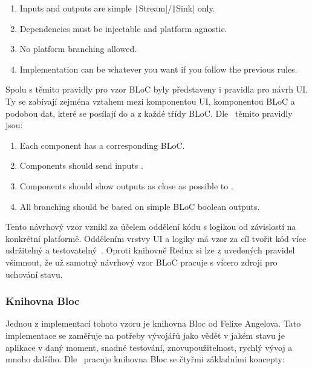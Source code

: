 \begin{enumerate}
    \item Inputs and outputs are simple
    \texttt|Stream|/\texttt|Sink| only.
    \item Dependencies must be injectable and platform agnostic.
    \item No platform branching allowed.
    \item Implementation can be whatever you want
    if you follow the previous rules.
\end{enumerate}

Spolu s těmito pravidly pro vzor BLoC byly představeny
\cite{googledevelopers_bloc} i pravidla pro návrh UI.
Ty se zabívají zejména vztahem mezi komponentou UI, komponentou BLoC
a podobou dat,
které se posílají do a z každé třídy BLoC.
Dle~\cite{googledevelopers_bloc} těmito pravidly jsou:

\begin{enumerate}
    \item Each  component has a corresponding BLoC.
    \item Components should send inputs .
    \item Components should show outputs as close as possible to .
    \item All branching should be based on simple BLoC boolean outputs.
\end{enumerate}

Tento návrhový vzor vznikl za účelem oddělení kódu s logikou
od závislostí na konkrétní platformě.
Oddělením vrstvy UI a logiky má vzor za cíl tvořit kód více udržitelný a
testovatelný~\cite{flutterando_analyzing_bloc_mobx}.
Oproti knihovně Redux si lze z uvedených pravidel všimnout,
že už samotný návrhový vzor BLoC pracuje s vícero zdroji pro uchování stavu.

\subsubsection{Knihovna Bloc}

Jednou z implementací tohoto vzoru je knihovna Bloc od Felixe Angelova.
\cite{bloclibrary_whybloc}
Tato implementace se zaměřuje na potřeby vývojářů jako
vědět v jakém stavu je aplikace v daný moment, snadné testování,
znovupoužitelnost, rychlý vývoj a mnoho dalšího. 
Dle~\cite{bloclibrary_coreconcepts} pracuje knihovna Bloc se čtyřmi základními
koncepty: 

